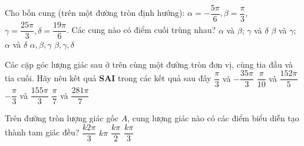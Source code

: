 \begin{ex}%
Cho bốn cung (trên một đường tròn định hướng): $\alpha =-\dfrac{5\pi}{6},\beta =\dfrac{\pi}{3}$, $\gamma =\dfrac{25\pi}{3},\delta =\dfrac{19\pi}{6}$. Các cung nào có điểm cuối trùng nhau?
\choice
{$\alpha $ và $\beta $; $\gamma $ và $\delta $}
{\True $\beta $ và $\gamma $; $\alpha $ và $\delta $}
{$\alpha,\beta,\gamma $}
{$\beta,\gamma,\delta $}
\end{ex}

\begin{ex}%
Các cặp góc lượng giác sau ở trên cùng một đường tròn đơn vị, cùng tia đầu và tia cuối. Hãy nêu kết quả {\bf SAI} trong các kết quả sau đây
\choice
{$\dfrac{\pi}{3}$ và $-\dfrac{35\pi}{3}$}
{\True $\dfrac{\pi}{10}$ và $\dfrac{152\pi}{5}$}
{$-\dfrac{\pi}{3}$ và $\dfrac{155\pi}{3}$}
{$\dfrac{\pi}{7}$ và $\dfrac{281\pi}{7}$}
\end{ex}

\begin{ex}%
Trên đường tròn lượng giác gốc $A$, cung lượng giác nào có các điểm biểu diễn tạo thành tam giác đều?
\choice
{\True $\dfrac{k2\pi}{3}$}
{$k\pi $}
{$\dfrac{k\pi}{2}$}
{$\dfrac{k\pi}{3}$}
\end{ex}

